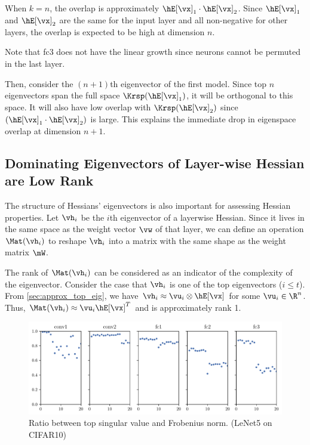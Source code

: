When $k=n$, the overlap is approximately $\hE[\vx]_1 \cdot \hE[\vx]_2$. Since $\hE[\vx]_1$ and $\hE[\vx]_2$ are the same for the input layer and all non-negative for other layers, the overlap is expected to be high at dimension $n$. 

Note that fc3 does not have the linear growth since neurons cannot be permuted in the last layer. 

Then, consider the $(n+1)$th eigenvector of the first model. Since top $n$ eigenvectors span the full space $\Krsp(\hE[\vx]_1)$, it will be orthogonal to this space. It will also have low overlap with $\Krsp(\hE[\vx]_2)$ since $(\hE[\vx]_1 \cdot \hE[\vx]_2)$ is large. This explains the immediate drop in eigenspace overlap at dimension $n+1$. 

\subsection{Dominating Eigenvectors of Layer-wise Hessian are Low Rank}
\label{sec:domin_eig}
The structure of Hessians' eigenvectors is also important for assessing Hessian properties. Let $\vh_i$ be the $i$th eigenvector of a layerwise Hessian. Since it lives in the same space as the weight vector $\vw$ of that layer, we can define an operation $\Mat(\vh_i)$ to reshape $\vh_i$ into a matrix with the same shape as the weight matrix $\mW$. 

The rank of $\Mat(\vh_i)$ can be considered as an indicator of the complexity of the eigenvector. Consider the case that $\vh_i$ is one of the top eigenvectors ($i \leq t$). From \cref{sec:approx_top_eig}, we have $\vh_i \approx \vu_i \otimes \hE[\vx]$ for some $\vu_i \in \R^n$. Thus, $\Mat(\vh_i) \approx \vu_i\hE[\vx]^T$ and is approximately rank 1.
\begin{figure}[ht]
    \centering
    \includegraphics[width=\textwidth]{Figures/Eigenvec_Lowrank/NLeNet_base/Top_Eigenvector_rank_CIFAR10_Exp1_LeNet5_normnew_fixlr0.01R1_E-1_20.pdf}
    \captionsetup{justification=centering}
    \caption{Ratio between top singular value and Frobenius norm. (LeNet5 on CIFAR10)}
    \label{fig:eigen_lowrank}
\end{figure}

